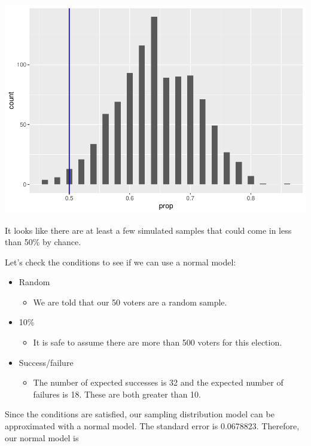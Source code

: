 \documentclass[
]{book}
\providecommand{\tightlist}{%
  \setlength{\itemsep}{0pt}\setlength{\parskip}{0pt}}
\begin{document}
\includegraphics{intro_stats_files/figure-latex/unnamed-chunk-376-1.pdf}

It looks like there are at least a few simulated samples that could come in less than 50\% by chance.

Let's check the conditions to see if we can use a normal model:

\begin{itemize}
\tightlist
\item
  Random

  \begin{itemize}
  \tightlist
  \item
    We are told that our 50 voters are a random sample.
  \end{itemize}
\item
  10\%

  \begin{itemize}
  \tightlist
  \item
    It is safe to assume there are more than 500 voters for this election.
  \end{itemize}
\item
  Success/failure

  \begin{itemize}
  \tightlist
  \item
    The number of expected successes is 32 and the expected number of failures is 18. These are both greater than 10.
  \end{itemize}
\end{itemize}

Since the conditions are satisfied, our sampling distribution model can be approximated with a normal model. The standard error is 0.0678823. Therefore, our normal model is
\end{document}

